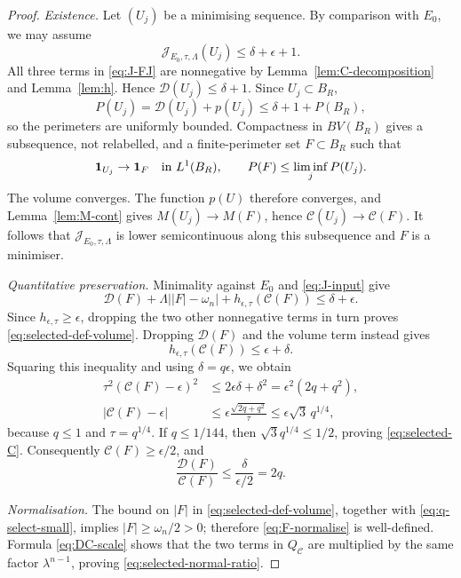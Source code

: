\documentclass[11pt]{amsart}
\theoremstyle{definition}
\newcommand{\Per}{P}
\newcommand{\Def}{\mathcal D}
\begin{document}
\begin{proof}
\emph{Existence.}
Let \((U_j)\) be a minimising sequence.  By comparison with \(E_0\), we may
assume
\[
   \mathcal J_{E_0,\tau,\Lambda}(U_j)\le\delta+\epsilon+1.
\]
All three terms in \eqref{eq:J-FJ} are nonnegative by
Lemma~\ref{lem:C-decomposition} and Lemma~\ref{lem:h}.  Hence
\(\Def(U_j)\le\delta+1\).  Since \(U_j\subset B_R\),
\[
   \Per(U_j)=\Def(U_j)+p(U_j)
   \le \delta+1+\Per(B_R),
\]
so the perimeters are uniformly bounded.  Compactness in \(BV(B_R)\)
gives a subsequence, not relabelled, and a finite-perimeter set
\(F\subset B_R\) such that
\[
   {\bf1}_{U_j}\to{\bf1}_{F}\quad\text{in }L^1(B_R),
   \qquad
   \Per(F)\le\liminf_j\Per(U_j).
\]
The volume converges.  The function \(p(U)\) therefore converges, and
Lemma~\ref{lem:M-cont} gives \(M(U_j)\to M(F)\), hence
\(\mathcal C(U_j)\to\mathcal C(F)\).  It follows that
\(\mathcal J_{E_0,\tau,\Lambda}\) is lower semicontinuous along this
subsequence and \(F\) is a minimiser.

\emph{Quantitative preservation.}
Minimality against \(E_0\) and \eqref{eq:J-input} give
\[
   \Def(F)+\Lambda\bigl||F|-\omega_n\bigr|
   +h_{\epsilon,\tau}(\mathcal C(F))
   \le\delta+\epsilon.
\tag{4.24}\label{eq:minimal-compare}
\]
Since \(h_{\epsilon,\tau}\ge\epsilon\), dropping the two other nonnegative
terms in turn proves \eqref{eq:selected-def-volume}.  Dropping
\(\Def(F)\) and the volume term instead gives
\[
   h_{\epsilon,\tau}(\mathcal C(F))\le\epsilon+\delta.
\]
Squaring this inequality and using \(\delta=q\epsilon\), we obtain
\[
\begin{aligned}
   \tau^2(\mathcal C(F)-\epsilon)^2
   &\le2\epsilon\delta+\delta^2
     =\epsilon^2(2q+q^2), \\
   |\mathcal C(F)-\epsilon|
   &\le\epsilon\frac{\sqrt{2q+q^2}}{\tau}
     \le\epsilon\sqrt3\,q^{1/4},
\end{aligned}
\]
because \(q\le1\) and \(\tau=q^{1/4}\).  If \(q\le1/144\), then
\(\sqrt3q^{1/4}\le1/2\), proving \eqref{eq:selected-C}.
Consequently \(\mathcal C(F)\ge\epsilon/2\), and
\[
   \frac{\Def(F)}{\mathcal C(F)}
   \le\frac{\delta}{\epsilon/2}=2q.
\]

\emph{Normalisation.}
The bound on \(|F|\) in \eqref{eq:selected-def-volume}, together with
\eqref{eq:q-select-small}, implies \(|F|\ge\omega_n/2>0\); therefore
\eqref{eq:F-normalise} is well-defined.  Formula \eqref{eq:DC-scale}
shows that the two terms in \(Q_{\mathcal C}\) are multiplied by the same
factor \(\lambda^{n-1}\), proving \eqref{eq:selected-normal-ratio}.
\end{proof}
\end{document}
